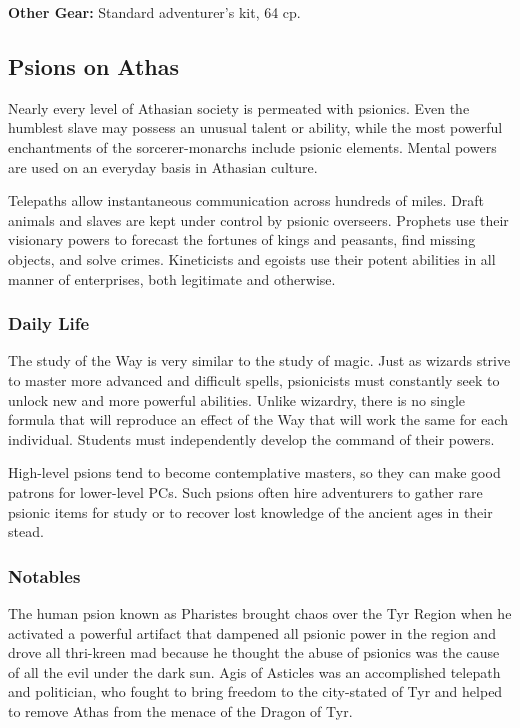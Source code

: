 \textbf{Other Gear:} Standard adventurer's kit, 64 cp.

\subsection{Psions on Athas}

Nearly every level of Athasian society is permeated with psionics. Even the humblest slave may possess an unusual talent or ability, while the most powerful enchantments of the sorcerer-monarchs include psionic elements. Mental powers are used on an everyday basis in Athasian culture.

Telepaths allow instantaneous communication across hundreds of miles. Draft animals and slaves are kept under control by psionic overseers. Prophets use their visionary powers to forecast the fortunes of kings and peasants, find missing objects, and solve crimes. Kineticists and egoists use their potent abilities in all manner of enterprises, both legitimate and otherwise.

\subsubsection{Daily Life}
The study of the Way is very similar to the study of magic. Just as wizards strive to master more advanced and difficult spells, psionicists must constantly seek to unlock new and more powerful abilities. Unlike wizardry, there is no single formula that will reproduce an effect of the Way that will work the same for each individual. Students must independently develop the command of their powers.

High-level psions tend to become contemplative masters, so they can make good patrons for lower-level PCs. Such psions often hire adventurers to gather rare psionic items for study or to recover lost knowledge of the ancient ages in their stead.

\subsubsection{Notables}
The human psion known as Pharistes brought chaos over the Tyr Region when he activated a powerful artifact that dampened all psionic power in the region and drove all thri-kreen mad because he thought the abuse of psionics was the cause of all the evil under the dark sun. Agis of Asticles was an accomplished telepath and politician, who fought to bring freedom to the city-stated of Tyr and helped to remove Athas from the menace of the Dragon of Tyr.

